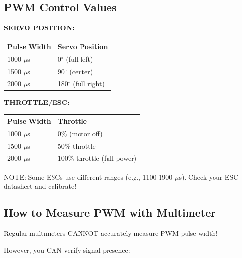 \documentclass[11pt,letterpaper]{article}
\begin{document}
\subsection{PWM Control Values}

\textbf{SERVO POSITION:}

\begin{center}
\begin{tabular}{ll}
\textbf{Pulse Width} & \textbf{Servo Position} \\
\hline
1000 $\mu$s & 0$^\circ$ (full left) \\
1500 $\mu$s & 90$^\circ$ (center) \\
2000 $\mu$s & 180$^\circ$ (full right) \\
\end{tabular}
\end{center}

\textbf{THROTTLE/ESC:}

\begin{center}
\begin{tabular}{ll}
\textbf{Pulse Width} & \textbf{Throttle} \\
\hline
1000 $\mu$s & 0\% (motor off) \\
1500 $\mu$s & 50\% throttle \\
2000 $\mu$s & 100\% throttle (full power) \\
\end{tabular}
\end{center}

\begin{warningbox}
NOTE: Some ESCs use different ranges (e.g., 1100-1900 $\mu$s). Check your ESC datasheet and calibrate!
\end{warningbox}

\subsection{How to Measure PWM with Multimeter}

\begin{warningbox}
Regular multimeters CANNOT accurately measure PWM pulse width!
\end{warningbox}

However, you CAN verify signal presence:
\end{document}

